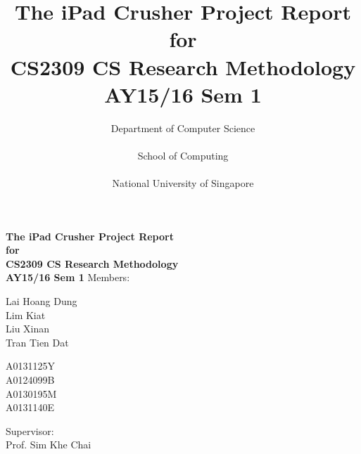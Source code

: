 \documentclass[12pt,a4paper,oneside]{report}
\begin{document}
\title{\Huge\textbf{The iPad Crusher \vfill
	\large Project Report \\ \bigskip
	for \\ \bigskip
	CS2309 CS Research Methodology \\ \bigskip
	\large AY15/16 Sem 1 \vfill}
	}
\author{
	Department of Computer Science \\\\
	School of Computing \\\\
	National University of Singapore}

\maketitle


\begin{titlepage}
\thispagestyle{plain}
\begin{center}
\textbf{\Huge The iPad Crusher \vfill
	\large Project Report \\ \bigskip
	for \\ \bigskip
	CS2309 CS Research Methodology \\ \bigskip
	AY15/16 Sem 1} \vfill \vfill
\large Members: \\ \bigskip
\begin{minipage}[t]{0.3\textwidth}
\begin{flushleft}
Lai Hoang Dung \\ \bigskip
Lim Kiat \\ \bigskip
Liu Xinan \\ \bigskip
Tran Tien Dat
\end{flushleft}
\end{minipage}
\begin{minipage}[t]{0.3\textwidth}
\begin{flushright}
A0131125Y \\ \bigskip
A0124099B \\ \bigskip
A0130195M \\ \bigskip
A0131140E
\end{flushright}
\end{minipage} \vfill
Supervisor: \\ \bigskip
Prof. Sim Khe Chai
\end{center}
\end{titlepage}
\end{document}

